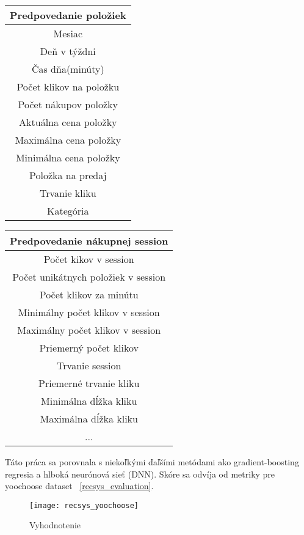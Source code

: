 \parbox{.45\linewidth}{

	\begin{tabular}{||c||} 
		\hline
		Predpovedanie položiek  \\ [0.5ex] 
		\hline\hline
		Mesiac  \\ 
		\hline
		Deň v týždni  \\
		\hline
		Čas dňa(minúty) \\
		\hline
		Počet klikov na položku \\
		\hline
		Počet nákupov položky  \\ 
		\hline
		Aktuálna cena položky  \\
		\hline
		Maximálna cena položky \\
		\hline
		Minimálna cena položky \\
		\hline
		Položka na predaj \\
		\hline
		Trvanie kliku \\
		\hline
		Kategória \\ [1ex] 
		\hline
	\end{tabular}
}
\parbox{.45\linewidth}{
	\begin{tabular}{||c||} 
		\hline
		Predpovedanie nákupnej session  \\ [0.5ex] 
		\hline\hline
		Počet kikov v session  \\ 
		\hline
		Počet unikátnych položiek v session  \\
		\hline
		Počet klikov za minútu \\
		\hline
		Minimálny počet klikov v session \\
		\hline
		Maximálny počet klikov v session  \\ 
		\hline
		Priemerný počet klikov \\
		\hline
		Trvanie session \\
		\hline
		Priemerné trvanie kliku\\
		\hline
		Minimálna dĺžka kliku \\
		\hline
		Maximálna dĺžka kliku \\
		\hline
		... \\ [1ex] 
		\hline
	\end{tabular}
}

Táto práca sa porovnala s niekoľkými ďaľšími metódami ako gradient-boosting regresia a hlboká neurónová sieť (DNN). Skóre sa odvíja od metriky pre yoochoose dataset ~\ref{recsys_evaluation}.

\begin{figure}[H]
	\begin{center}
		\texttt{[image: recsys\_yoochoose]}\end{center}
	\caption[pixelmap]{Vyhodnotenie}
	\label{fig:evaluation}
\end{figure}


